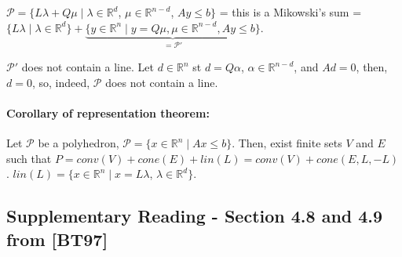 \documentclass[main]{subfiles}
\begin{document}
$\mathcal{P} = \{L \lambda + Q \mu \mid \lambda \in \mathbb{R}^d$, $\mu \in
\mathbb{R}^{n-d}$, $Ay \leq b\}$ = this is a Mikowski's sum = $\{L \lambda \mid
\lambda \in \mathbb{R}^d \} + \underbrace{ \{ y \in \mathbb{R}^n \mid y = Q\mu, 
\mu \in \mathbb{R}^{n-d}, Ay \leq b \} }_{= \mathcal{P}'}$.

$\mathcal{P}'$ does not contain a line. Let $d \in \mathbb{R}^n$ st $d= Q
\alpha$, $\alpha \in \mathbb{R}^{n-d}$, and $Ad =0$, then, $d=0$, so, indeed,
$\mathcal{P}$ does not contain a line.

\paragraph{Corollary of representation theorem:} Let $\mathcal{P}$ be a
polyhedron, $\mathcal{P} = \{x\in \mathbb{R}^n \mid Ax \leq b \}$. Then, exist
finite sets $V$ and $E$ such that $P = conv(V) + cone(E) + lin(L) = conv(V) +
cone(E, L, -L)$. $lin(L) = \{x \in \mathbb{R}^n \mid x = L \lambda$, $\lambda
\in \mathbb{R}^d \}$.


\subsection{Supplementary Reading - Section 4.8 and 4.9 from [BT97]}
\end{document}
